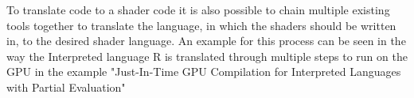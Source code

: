 To translate code to a shader code it is also possible to chain multiple existing tools together to translate the language, in which the shaders should be written in, to the desired shader language. An example for this process can be seen in the way the Interpreted language R is translated through multiple steps to run on the GPU in the example "Just-In-Time GPU Compilation for Interpreted Languages with Partial Evaluation"